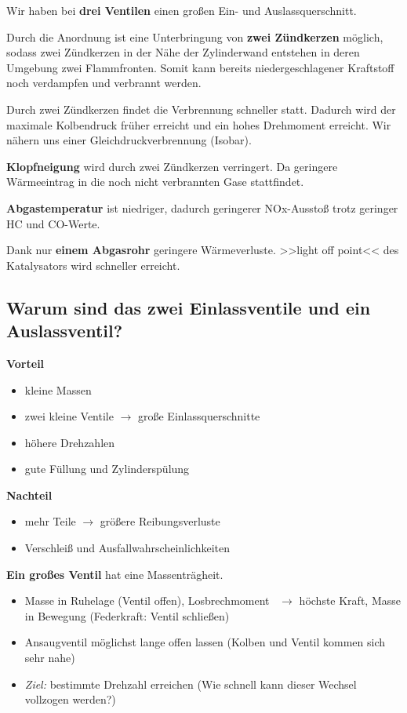 Wir haben bei \textbf{drei Ventilen} einen großen Ein- und
Auslassquerschnitt.

Durch die Anordnung ist eine Unterbringung von \textbf{zwei Zündkerzen}
möglich, sodass zwei Zündkerzen in der Nähe der Zylinderwand entstehen
in deren Umgebung zwei Flammfronten. Somit kann bereits
niedergeschlagener Kraftstoff noch verdampfen und verbrannt werden.

Durch zwei Zündkerzen findet die Verbrennung schneller statt. Dadurch
wird der maximale Kolbendruck früher erreicht und ein hohes Drehmoment
erreicht. Wir nähern uns einer Gleichdruckverbrennung (Isobar).

\textbf{Klopfneigung} wird durch zwei Zündkerzen verringert. Da
geringere Wärmeeintrag in die noch nicht verbrannten Gase stattfindet.

\textbf{Abgastemperatur} ist niedriger, dadurch geringerer NOx-Ausstoß
trotz geringer HC und CO-Werte.

Dank nur \textbf{einem Abgasrohr} geringere Wärmeverluste. >>light off
point<< des Katalysators wird schneller erreicht.

\subsection{Warum sind das zwei Einlassventile und ein
Auslassventil?}\label{warum-sind-das-zwei-einlassventile-und-ein-auslassventil}

\textbf{Vorteil}

\begin{itemize}
\item
  kleine Massen
\item
  zwei kleine Ventile $\to$ große Einlassquerschnitte
\item
  höhere Drehzahlen
\item
  gute Füllung und Zylinderspülung
\end{itemize}

\textbf{Nachteil}

\begin{itemize}
\item
  mehr Teile $\to$ größere Reibungsverluste
\item
  Verschleiß und Ausfallwahrscheinlichkeiten
\end{itemize}

\textbf{Ein großes Ventil} hat eine Massenträgheit.

\begin{itemize}
\item
  Masse in Ruhelage (Ventil offen), Losbrechmoment~ $\to$ höchste
  Kraft, Masse in Bewegung (Federkraft: Ventil schließen)
\item
  Ansaugventil möglichst lange offen lassen (Kolben und Ventil kommen
  sich sehr nahe)
\item
  \emph{Ziel:} bestimmte Drehzahl erreichen (Wie schnell kann dieser
  Wechsel vollzogen werden?)
\end{itemize}


